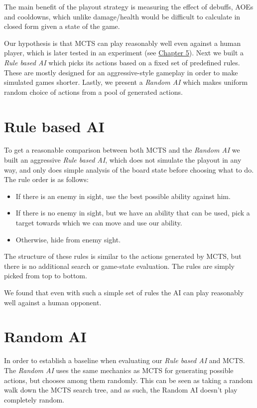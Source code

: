 The main benefit of the playout strategy is measuring the effect of debuffs, AOEs and cooldowns, which unlike damage/health would be difficult to calculate in closed form given a state of the game.

Our hypothesis is that MCTS can play reasonably well even against a human
player, which is later tested in an experiment (see
\hyperref[chapter05]{Chapter 5}).  Next we built a \emph{Rule based AI} which
picks its actions based on a fixed set of predefined rules. These are mostly
designed for an aggressive-style gameplay in order to make simulated games
shorter. Lastly, we present a \emph{Random AI} which makes uniform random
choice of actions from a pool of generated actions.

\section{Rule based AI}

To get a reasonable comparison between both MCTS and the \emph{Random AI} we
built an aggressive \emph{Rule based AI}, which does not simulate the playout in
any way, and only does simple analysis of the board state before choosing what
to do. The rule order is as follows:

\begin{itemize}
\item If there is an enemy in sight, use the best possible ability against him.
\item If there is no enemy in sight, but we have an ability that can be used, pick a target towards which we can move and use our ability.
\item Otherwise, hide from enemy sight.
\end{itemize}

The structure of these rules is similar to the actions generated by MCTS,
but there is no additional search or game-state evaluation. The rules are
simply picked from top to bottom.

We found that even with such a simple set of rules the AI can play reasonably
well against a human opponent.

\section{Random AI}

In order to establish a baseline when evaluating our \emph{Rule based AI} and MCTS\@.
The \emph{Random AI} uses the same mechanics as MCTS for generating possible actions,
but chooses among them randomly. This can be seen as taking a random walk down
the MCTS search tree, and as such, the Random AI doesn't play completely random.

